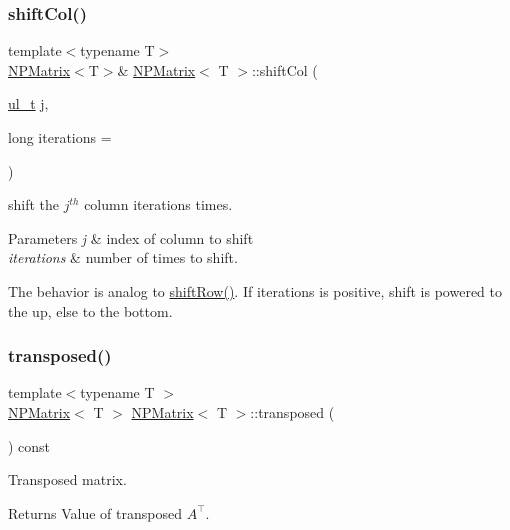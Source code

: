\subsubsection{\texorpdfstring{shiftCol()}{shiftCol()}}
{\footnotesize\ttfamily template$<$typename T$>$ \\
\mbox{\hyperlink{class_n_p_matrix}{N\+P\+Matrix}}$<$T$>$\& \mbox{\hyperlink{class_n_p_matrix}{N\+P\+Matrix}}$<$ T $>$\+::shift\+Col (\begin{DoxyParamCaption}\item[{\mbox{\hyperlink{typedef_8h_a1b140a2034db3f5dfe18a987745df43a}{ul\+\_\+t}}}]{j,  }\item[{long}]{iterations = {} }\end{DoxyParamCaption})\hspace{0.3cm}{\ttfamily [inline]}}



shift the $ j^{th} $ column {\ttfamily iterations} times. 


\begin{DoxyParams}{Parameters}
{\em j} & index of column to shift \\
\hline
{\em iterations} & number of times to shift.\\
\hline
\end{DoxyParams}
The behavior is analog to {\ttfamily \mbox{\hyperlink{class_n_p_matrix_a8927e2dc64af30c6f619a93678332093}{shift\+Row()}}}. If {\ttfamily iterations} is positive, shift is powered to the up, else to the bottom. \mbox{\label{class_n_p_matrix_abb4f410d97dc7e89798c67112c1e1bd3}} 
\subsubsection{\texorpdfstring{transposed()}{transposed()}}
{\footnotesize\ttfamily template$<$typename T $>$ \\
\mbox{\hyperlink{class_n_p_matrix}{N\+P\+Matrix}}$<$ T $>$ \mbox{\hyperlink{class_n_p_matrix}{N\+P\+Matrix}}$<$ T $>$\+::transposed (\begin{DoxyParamCaption}{ }\end{DoxyParamCaption}) const}



Transposed matrix. 

\begin{DoxyReturn}{Returns}
Value of transposed $ A^\top $. 
\end{DoxyReturn}
\mbox{\label{class_n_p_matrix_a007a87743223b6dddaa3ec8e44489ffb}} 
